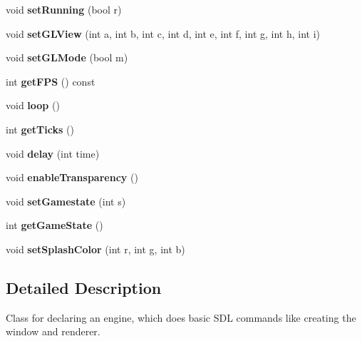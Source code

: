 \begin{DoxyCompactItemize}
$$void {\bfseries set\+Running} (bool r)
\item 
\mbox{\label{classEngine_ad5387289f39246870a3c40d61b31fed8}} 
void {\bfseries set\+G\+L\+View} (int a, int b, int c, int d, int e, int f, int g, int h, int i)
\item 
\mbox{\label{classEngine_a0ac77a2abc0269f3825a184fbfcef3dd}} 
void {\bfseries set\+G\+L\+Mode} (bool m)
\item 
\mbox{\label{classEngine_a030675a3b74445ea6c19073594510fdf}} 
int {\bfseries get\+F\+PS} () const
\item 
\mbox{\label{classEngine_a514f8d788ced7c6508b8b6f9ef66ccb1}} 
void {\bfseries loop} ()
\item 
\mbox{\label{classEngine_adfac6631b6c52bcb43811742aa172d9d}} 
int {\bfseries get\+Ticks} ()
\item 
\mbox{\label{classEngine_a15aa4850592df8924eb542ff0709bd98}} 
void {\bfseries delay} (int time)
\item 
\mbox{\label{classEngine_a74e701ab9fb6a69713f9867d9962630e}} 
void {\bfseries enable\+Transparency} ()
\item 
\mbox{\label{classEngine_ab0353877b7da9431718029c77db2d35d}} 
void {\bfseries set\+Gamestate} (int s)
\item 
\mbox{\label{classEngine_aba0938d28018a9ed9bcea2a78c28b972}} 
int {\bfseries get\+Game\+State} ()
\item 
\mbox{\label{classEngine_a095fb17299a5a7eac3acd98dceff6fd3}} 
void {\bfseries set\+Splash\+Color} (int r, int g, int b)
\end{DoxyCompactItemize}


\subsection{Detailed Description}
Class for declaring an engine, which does basic S\+DL commands like creating the window and renderer. 

